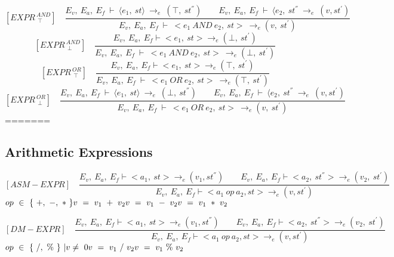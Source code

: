 	\[	
	[EXPR^{\ AND}_{\ \ \top}] \quad	
	\dfrac{E_v, \ E_a, \ E_f \ \vdash \ \langle e_1, \ st \rangle \ \rightarrow_e \ (\top, \ st^{''}) \qquad E_v, \ E_a, \ E_f \ \vdash \ \langle e_2, \ st^{''} \ \rightarrow_e \ (v, st^{'})}{E_v, \ E_a, \ E_f \ \vdash \ <e_1 \ AND \ e_2, \ st> \ \rightarrow_e (v, \ st^{'})}	
	\] \newline
	\[	
	[EXPR^{\ AND}_{\ \ \bot}] \quad	
	\dfrac{E_v, \ E_a, \ E_f \vdash <e_1, \ st> \rightarrow_e (\bot, \ st^{'}) }{E_v, \ E_a, \ E_f \ \vdash \ <e_1 \ AND \ e_2, \ st> \ \rightarrow_e (\bot, \ st^{'})}	
	\]\newline
	\[	
	[EXPR^{\ OR}_{\ \ \top}] \quad	
	\dfrac{E_v, \ E_a, \ E_f \vdash <e_1, \ st> \rightarrow_e (\top, \ st^{'}) }{E_v, \ E_a, \ E_f \ \vdash \ <e_1 \ OR \ e_2, \ st> \ \rightarrow_e (\top, \ st^{'})}	
	\]\newline
	\[	
	[EXPR^{\ OR}_{\ \ \bot}] \quad	
	\dfrac{E_v, \ E_a, \ E_f \ \vdash \ \langle e_1, \ st \rangle \ \rightarrow_e \ (\bot, \ st^{''}) \qquad E_v, \ E_a, \ E_f \ \vdash \ \langle e_2, \ st^{''} \ \rightarrow_e \ (v, st^{'})}{E_v, \ E_a, \ E_f \ \vdash \ <e_1 \ OR \ e_2, \ st> \ \rightarrow_e (v, \ st^{'})}
	\]
=======
   	
   	\subsection{Arithmetic Expressions}
   	
   	\[
   	[ASM-EXPR] \quad
   	\dfrac{E_v, \ E_a, \ E_f \vdash <a_1, \ st> \rightarrow_{e} (v_1, st^{''}) \qquad E_v, \ E_a, \ E_f \vdash <a_2, \ st^{''}> \rightarrow_e (v_2, \ st^{'})}{E_v, \ E_a, \ E_f \vdash <a_1 \ op \ a_2, st> \rightarrow_{e} (v, st^{'})}
   	\]
 	\begin{math}
 	op \ \in \ \{ \ +, \ -, \ * \ \} \newline
   	v \ = \ v_1 \ + \ v_2 \newline
   	v \ = \ v_1 \ - \ v_2 \newline
   	v \ = \ v_1 \ * \ v_2
   	\end{math}
   	
   	\[
   	[DM-EXPR] \quad
   	\dfrac{E_v, \ E_a, \ E_f \vdash <a_1, \ st> \rightarrow_{e} (v_1, st^{''}) \qquad E_v, \ E_a, \ E_f \vdash <a_2, \ st^{''}> \rightarrow_e (v_2, \ st^{'})}{E_v, \ E_a, \ E_f \vdash <a_1 \ op \ a_2, st> \rightarrow_{e} (v, st^{'})}
   	\]
   	\begin{math}
   	op \ \in \ \{ \ /, \ \% \ \} \ | v \not= \ 0 \newline 
   	v \ = \ v_1 \ / \ v_2 \newline
   	v \ = \ v_1 \ \% \ v_2
   	\end{math}   	   	   	

